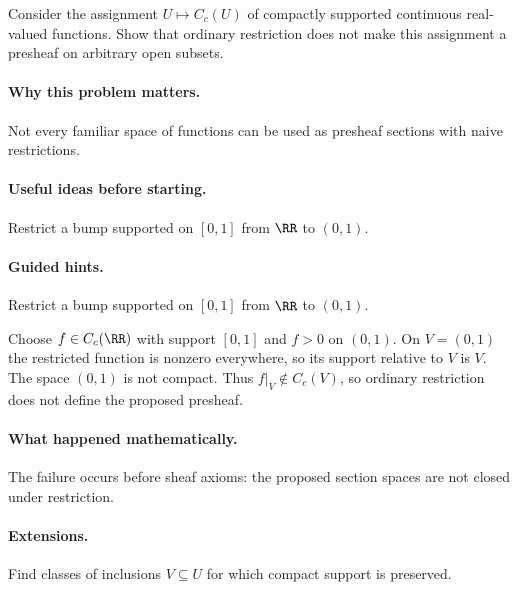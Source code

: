 \begin{problem}
Consider the assignment $U\mapsto C_c(U)$ of compactly supported continuous real-valued functions.  Show that ordinary restriction does not make this assignment a presheaf on arbitrary open subsets.
\end{problem}

\paragraph{Why this problem matters.}
Not every familiar space of functions can be used as presheaf sections with naive restrictions.

\paragraph{Useful ideas before starting.}
Restrict a bump supported on $[0,1]$ from $\RR$ to $(0,1)$.

\paragraph{Guided hints.}
Restrict a bump supported on $[0,1]$ from $\RR$ to $(0,1)$.

\begin{solution}
Choose $f\in C_c(\RR)$ with support $[0,1]$ and $f>0$ on $(0,1)$.  On $V=(0,1)$ the restricted function is nonzero everywhere, so its support relative to $V$ is $V$.  The space $(0,1)$ is not compact.  Thus $f|_V\notin C_c(V)$, so ordinary restriction does not define the proposed presheaf.
\end{solution}

\paragraph{What happened mathematically.}
The failure occurs before sheaf axioms: the proposed section spaces are not closed under restriction.

\paragraph{Extensions.}
Find classes of inclusions $V\subseteq U$ for which compact support is preserved.
